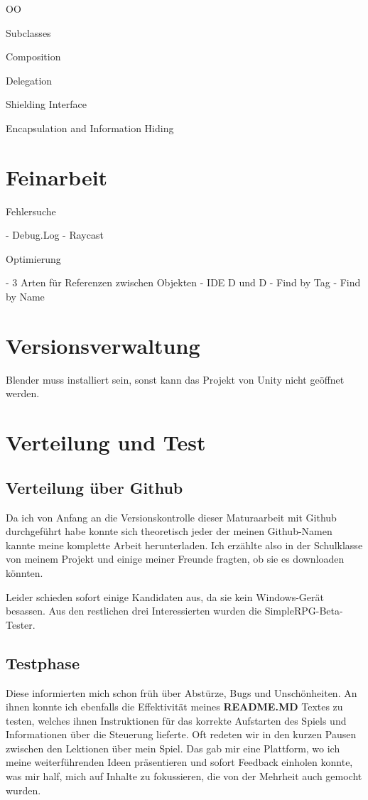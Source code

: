 
OO

Subclasses

Composition

Delegation

Shielding Interface

Encapsulation and Information Hiding


\section{Feinarbeit}

Fehlersuche

- Debug.Log
- Raycast

Optimierung

- 3 Arten für Referenzen zwischen Objekten
	- IDE D und D
	- Find by Tag
	- Find by Name

\section{Versionsverwaltung}



Blender muss installiert sein, sonst kann das Projekt von Unity nicht geöffnet werden.

\section{Verteilung und Test}

\subsection{Verteilung über Github}

Da ich von Anfang an die Versionskontrolle dieser Maturaarbeit mit Github durchgeführt habe konnte sich theoretisch jeder der meinen Github-Namen kannte meine komplette Arbeit herunterladen.\cite{csomormaturaarbeit19github}
Ich erzählte also in der Schulklasse von meinem Projekt und einige meiner Freunde fragten, ob sie es downloaden könnten.

Leider schieden sofort einige Kandidaten aus, da sie kein Windows-Gerät besassen. Aus den restlichen drei Interessierten wurden die SimpleRPG-Beta-Tester.

\subsection{Testphase}

Diese informierten mich schon früh über Abstürze, Bugs und Unschönheiten.
An ihnen konnte ich ebenfalls die Effektivität meines \textbf{README.MD} Textes zu testen, welches ihnen Instruktionen für das korrekte Aufstarten des Spiels und Informationen über die Steuerung lieferte.
Oft redeten wir in den kurzen Pausen zwischen den Lektionen über mein Spiel.
Das gab mir eine Plattform, wo ich meine weiterführenden Ideen präsentieren und sofort Feedback einholen konnte, was mir half, mich auf Inhalte zu fokussieren, die von der Mehrheit auch gemocht wurden.


